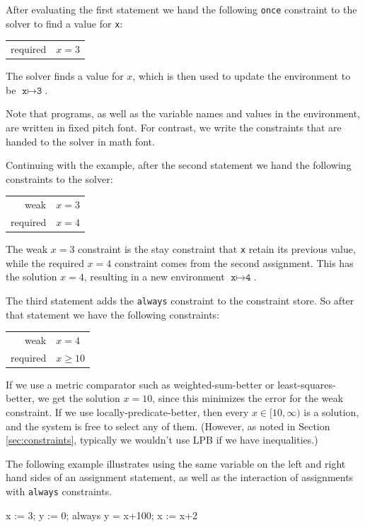 \documentclass{article}
\begin{document}
After evaluating the first statement we hand the following \verb|once|
constraint to the solver to find a value for \texttt{x}:

\begin{tabular}{rl}
required & $x=3$
\end{tabular}

The solver finds a value for $x$, which is then used to update the
environment to be $\texttt{x} \mapsto \texttt{3}$.

Note that programs, as well as the variable names and values in the
environment, are written in fixed pitch font.  For contrast, we write
the constraints that are handed to the solver in math font.

Continuing with the example, after the second statement we hand the
following constraints to the solver:

\begin{tabular}{rl}
weak     & $x=3$ \\
required & $x=4$
\end{tabular}

The weak $x=3$ constraint is the stay constraint that \texttt{x}
retain its previous value, while the required $x=4$ constraint comes
from the second assignment.  This has the solution $x=4$, resulting in
a new environment $\texttt{x} \mapsto \texttt{4}$.  

The third statement adds the \texttt{always} constraint to the
constraint store.  So after that statement we have the following
constraints:

\begin{tabular}{rl}
weak     & $x=4$ \\
required & $x \geq 10$
\end{tabular}

If we use a metric comparator such as weighted-sum-better or
least-squares-better, we get the solution $x=10$, since this minimizes
the error for the weak constraint.  If we use
locally-predicate-better, then every $x \in [10,\infty)$ is a solution,
and the system is free to select any of them.  (However, as noted in
Section \ref{sec:constraints}, typically we wouldn't use LPB if we
have inequalities.)

The following example illustrates using the same variable on the left
and right hand sides of an assignment statement, as well as the
interaction of assignments with \verb|always| constraints.
\begin{example}
x := 3;
y := 0;
always y = x+100;
x := x+2
\end{example}
\end{document}
